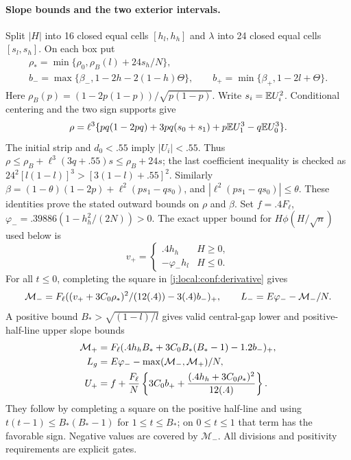 \paragraph{Slope bounds and the two exterior intervals.}
Split $|H|$ into 16 closed equal cells $[h_l,h_h]$ and $\lambda$ into
24 closed equal cells $[s_l,s_h]$. On each box put
\[
 \begin{gathered}
 \rho_* =\min\{\rho_0,\rho_B(l)+24s_h/N\},\\
 b_- =\max\{\beta_-,1-2h-2(1-h)\Theta\},\qquad
 b_+ =\min\{\beta_+,1-2l+\Theta\}.
 \end{gathered}
\]
Here $\rho_B(p)=(1-2p(1-p))/\sqrt{p(1-p)}$. Write $s_i=\mathbb E U_i^2$. Conditional centering and the two sign supports give
\[
 \rho=\ell^3\{pq(1-2pq)+3pq(s_0+s_1)
                  +p\mathbb E U_1^3-q\mathbb E U_0^3\}.
\]
The initial strip and $d_0<.55$ imply $|U_i|<.55$.
Thus $\rho\le\rho_B+\ell^3(3q+.55)s\le\rho_B+24s$; the last
coefficient inequality is checked as
$24^2[l(1-l)]^3>[3(1-l)+.55]^2$.
Similarly $\beta=(1-\theta)(1-2p)+\ell^2(ps_1-qs_0)$, and
$|\ell^2(ps_1-qs_0)|\le\theta$. These identities prove the stated
outward bounds on $\rho$ and $\beta$.
Set $f=.4F_\ell$, $\varphi_-=.39886(1-h_h^2/(2N))>0$.
The exact upper bound for $H\phi(H/\sqrt n)$ used below is
\[
 v_+=\begin{cases}.4h_h&H\ge0,\\-\varphi_-h_l&H\le0.\end{cases}
\]
For all $t\le0$, completing the square in \eqref{j:local:conf:derivative} gives
\[
 \mathcal M_-=F_\ell((v_++3C_0\rho_*)^2/(12(.4))-3(.4)b_-)_+,
 \qquad L_-=E\varphi_- -\mathcal M_-/N.
\]
A positive bound $B_*>\sqrt{(1-l)/l}$ gives valid central-gap lower
and positive-half-line upper slope bounds
\begin{align*}
 \mathcal M_+&=F_\ell(.4h_hB_*+3C_0B_*(B_*-1)-1.2b_-)_+,\\
 L_g&=E\varphi_--\max(\mathcal M_-,\mathcal M_+)/N,\\
 U_+&=f+\frac{F_\ell}{N}
 \left\{3C_0b_++\frac{(.4h_h+3C_0\rho_*)^2}{12(.4)}\right\}.
\end{align*}
They follow by completing a square on the positive half-line and using
$t(t-1)\le B_*(B_*-1)$ for $1\le t\le B_*$; on $0\le t\le1$ that
term has the favorable sign. Negative values are covered by $\mathcal M_-$.
All divisions and positivity requirements are explicit gates.

